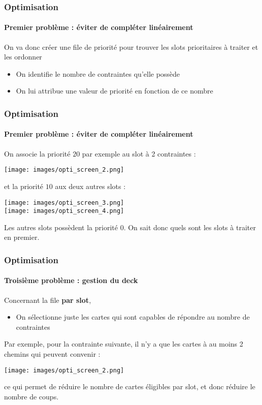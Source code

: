 \documentclass{beamer}
\begin{document}
\begin{frame}
	\frametitle{Optimisation}
	\framesubtitle{Premier problème : éviter de compléter linéairement}
	On va donc créer une file de priorité pour trouver les slots prioritaires à traiter et les ordonner
	\begin{itemize}
		\item On identifie le nombre de contraintes qu'elle possède 
		\item On lui attribue une valeur de priorité en fonction de ce nombre
	\end{itemize}

\end{frame}

\begin{frame}
	\frametitle{Optimisation}
	\framesubtitle{Premier problème : éviter de compléter linéairement}
	On associe la priorité $20$ par exemple au slot à 2 contraintes : 
	\begin{center}
		\texttt{[image: images/opti\_screen\_2.png]}
	\end{center}
	et la priorité $10$ aux deux autres slots : 
	\begin{center}
		 \texttt{[image: images/opti\_screen\_3.png]} \\  \texttt{[image: images/opti\_screen\_4.png]} 
	\end{center}
	\begin{flushright}
		Les autres slots possèdent la priorité 0. On sait donc quels sont les slots à traiter en premier.
	\end{flushright}
\end{frame}

\begin{frame}
	\frametitle{Optimisation}
	\framesubtitle{Troisième problème : gestion du deck}
	Concernant la file \textbf{par slot}, 
	\begin{itemize}
		\item On sélectionne juste les cartes qui sont capables de répondre au nombre de contraintes
	\end{itemize}
	Par exemple, pour la contrainte suivante, il n'y a que les cartes à au moins 2 chemins qui peuvent convenir : 
	\begin{center}
		\texttt{[image: images/opti\_screen\_2.png]}
	\end{center}
	\begin{flushright}
		ce qui permet de réduire le nombre de cartes éligibles par slot, et donc réduire le nombre de coups.
	\end{flushright}
\end{frame}
\end{document}
